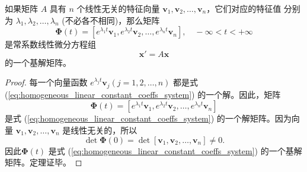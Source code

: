 \begin{theorem}[A具有n个线性无关特征向量时的基解矩阵]\label{thm:linearly_independent_eigenvectors_fundamental_matrix}
   如果矩阵 $A$ 具有 $n$ 个线性无关的特征向量 $\mathbf{v}_1, \mathbf{v}_2, \dots, \mathbf{v}_n$，它们对应的特征值
分别为 $\lambda_1, \lambda_2, \dots, \lambda_n$ (不必各不相同)，那么矩阵
$$\boldsymbol{\Phi}(t) = [e^{\lambda_1 t}\mathbf{v}_1, e^{\lambda_2 t}\mathbf{v}_2, \dots, e^{\lambda_n t}\mathbf{v}_n], \quad -\infty < t < +\infty$$
是常系数线性微分方程组
$$\mathbf{x}'=A\mathbf{x}$$
的一个基解矩阵。 
\end{theorem}
\begin{proof}
    每一个向量函数 $e^{\lambda_j t}\mathbf{v}_j (j=1,
2,\dots,n)$ 都是式 (\ref{eq:homogeneous_linear_constant_coeffs_system}) 的一个解。因此，矩阵
$$\boldsymbol{\Phi}(t) = [e^{\lambda_1 t}\mathbf{v}_1, e^{\lambda_2 t}\mathbf{v}_2, \dots, e^{\lambda_n t}\mathbf{v}_n]$$
是式 (\ref{eq:homogeneous_linear_constant_coeffs_system}) 的一个解矩阵。因为向量 $\mathbf{v}_1, \mathbf{v}_2, \dots, \mathbf{v}_n$ 是线性无关的，所以
$$\det \boldsymbol{\Phi}(0)=\det[\mathbf{v}_1, \mathbf{v}_2, \dots, \mathbf{v}_n] \ne 0.$$
因此$\boldsymbol{\Phi}(t)$ 是式 (\ref{eq:homogeneous_linear_constant_coeffs_system}) 的一个基解矩阵。定理证毕。
\end{proof}
